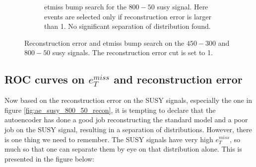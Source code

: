 \begin{figure}[h!]
\begin{subfigure}{.45\textwidth}
        \caption{etmiss bump search for the $800-50$ susy signal. Here events are selected only if reconstruction error is larger than 1. No significant 
        separation of distribution found.}
        \label{fig:vae_susy_800_50_trilep}
    \end{subfigure}
    \hfill      
    \caption{ Reconstruction error and etmiss bump search on the $450-300$ and $800-50$ susy signals. The reconstruction error cut is set to 1.}
    \label{fig:vae_susy_450_300_800_50_recon_trilep}
\end{figure}


\newpage
\subsection*{ROC curves on $e_T^{miss}$ and reconstruction error}
Now based on the reconstruction error on the SUSY signals, especially the one in figure \ref{fig:ae_susy_800_50_recon}, it is tempting to declare that the autoencoder 
has done a good job reconstructing the standard model and a poor job on the SUSY signal, resulting in a separation of distributions. However, there is one thing we need to remember. 
The SUSY signals have very high $e_T^{miss}$, so much so that one can separate them by eye on that distribution alone. This is presented in the figure below:

